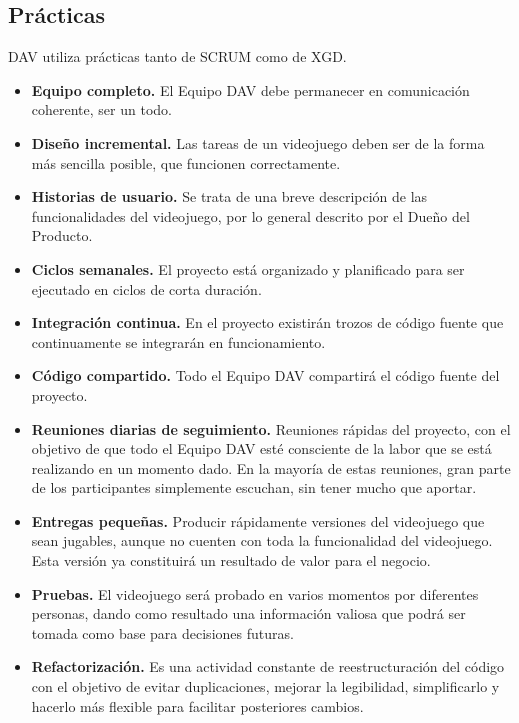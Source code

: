 \documentclass[a4paper, openright, 12pt]{report}
\begin{document}
\subsection*{Prácticas}
\justify
DAV utiliza prácticas tanto de SCRUM como de XGD.
\begin{itemize}
\item \textbf{Equipo completo.} El Equipo DAV debe permanecer en comunicación coherente, ser un todo.\cite{Implementacion2011}
\item \textbf{Diseño incremental.} Las tareas de un videojuego deben ser de la forma más sencilla posible, que funcionen correctamente.\cite{Implementacion2011}
\item \textbf{Historias de usuario.} Se trata de una breve descripción de las funcionalidades del videojuego, por lo general descrito por el Dueño del Producto.\cite{Implementacion2011} 
\item \textbf{Ciclos semanales.} El proyecto está organizado y planificado para ser ejecutado en ciclos de corta duración.\cite{Implementacion2011}
\item \textbf{Integración continua.} En el proyecto existirán trozos de código fuente que continuamente se integrarán en funcionamiento.\cite{Implementacion2011}
\item \textbf{Código compartido.} Todo el Equipo DAV compartirá el código fuente del proyecto. \cite{Implementacion2011} 
\item \textbf{Reuniones diarias de seguimiento.} Reuniones rápidas del proyecto, con el objetivo de que todo el Equipo DAV esté consciente de la labor que se está realizando en un momento dado. En la mayoría de estas reuniones, gran parte de los participantes simplemente escuchan, sin tener mucho que aportar. \cite{Implementacion2011} 
\item \textbf{Entregas pequeñas.} Producir rápidamente versiones del videojuego que sean jugables, aunque no cuenten con toda la funcionalidad del videojuego. Esta versión ya constituirá un resultado de valor para el negocio. \cite{Implementacion2011} 
\item \textbf{Pruebas.} El videojuego será probado en varios momentos por diferentes personas, dando como resultado una información valiosa que podrá ser tomada como base para decisiones futuras. \cite{Implementacion2011} 
\item \textbf{Refactorización.} Es una actividad constante de reestructuración del código con el objetivo de evitar duplicaciones, mejorar la legibilidad, simplificarlo y hacerlo más flexible para facilitar posteriores cambios. \cite{Implementacion2011}  

\end{itemize}
\end{document}
